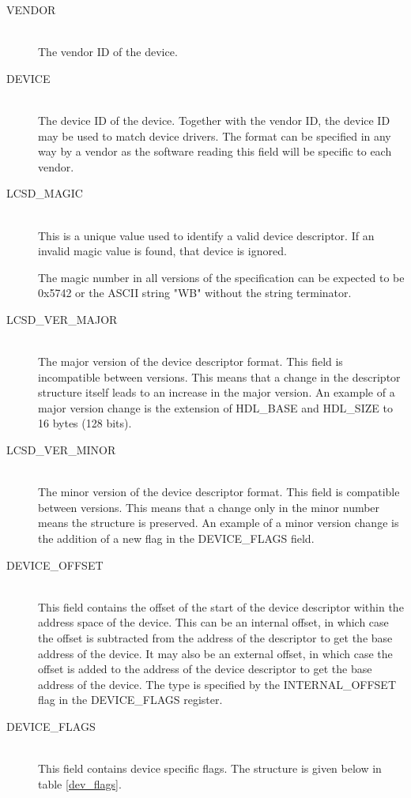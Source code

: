 \documentclass[a4paper, 12pt]{article}
\begin{document}
\begin{description}
\item[VENDOR] \hfill \\
The vendor ID of the device.

\item[DEVICE] \hfill \\
The device ID of the device. Together with the vendor ID, the
device ID may be used to match device drivers. The format can be specified
in any way by a vendor as the software reading this field will be
specific to each vendor.

\item[LCSD\_MAGIC] \hfill \\
This is a unique value used to identify a valid device descriptor. If
an invalid magic value is found, that device is ignored.

The magic number in all versions of the specification can be expected to
be 0x5742 or the ASCII string "WB" without the string terminator.

\item[LCSD\_VER\_MAJOR] \hfill \\
The major version of the device descriptor format. This field is incompatible
between versions. This means that a change in the descriptor structure itself
leads to an increase in the major version. An example of a major version change
is the extension of HDL\_BASE and HDL\_SIZE to 16 bytes (128 bits).

\item[LCSD\_VER\_MINOR] \hfill \\
The minor version of the device descriptor format. This field is compatible
between versions. This means that a change only in the minor number means the
structure is preserved. An example of a minor version change is the addition
of a new flag in the DEVICE\_FLAGS field.

\item[DEVICE\_OFFSET] \hfill \\
This field contains the offset of the start of the device descriptor within
the address space of the device. This can be an internal offset, in which
case the offset is subtracted from the address of the descriptor to get the
base address of the device. It may also be an external offset, in which
case the offset is added to the address of the device descriptor to get the
base address of the device. The type is specified by the INTERNAL\_OFFSET
flag in the DEVICE\_FLAGS register.

\item[DEVICE\_FLAGS] \hfill \\
This field contains device specific flags. The structure is given below in
table \ref{dev_flags}.


\end{description}
\end{document}

